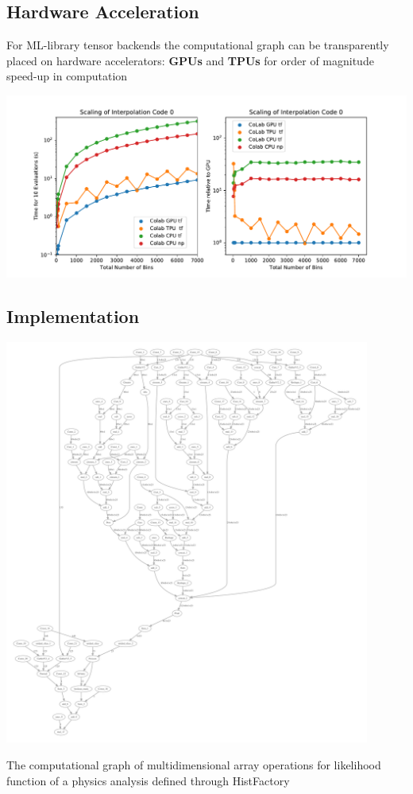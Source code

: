 \documentclass[a0paper,fleqn]{betterposter}
\begin{document}
{ \subsection{Hardware Acceleration}
 For ML-library tensor backends the computational graph can be transparently placed on hardware accelerators: \textbf{GPUs} and \textbf{TPUs} for order of magnitude speed-up in computation
 \begin{center}
  \includegraphics[width=\textwidth]{scaling_hardware.pdf}
 \end{center}
}{

 \subsection{Implementation}
 \begin{center}
  \includegraphics[width=0.9\textwidth]{computational_graph3.pdf}
 \end{center}
 The computational graph of multidimensional array operations for likelihood function of a physics analysis defined through HistFactory

}
\end{document}
